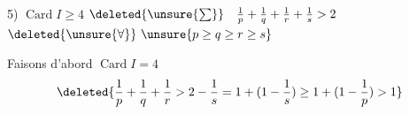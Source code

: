 5) $\operatorname{Card}I\ge4$\qquad
$\deleted{\unsure{\sum}}\quad\frac1p+\frac1q+\frac1r+\frac1s>2$\qquad
$\deleted{\unsure{\forall}}\ \unsure{p\ge q\ge r\ge s}$

Faisons d'abord $\operatorname{Card}I=4$
\[
\deleted{\frac1p+\frac1q+\frac1r>2-\frac1s=1+(1-\frac1s)\ge1+(1-\frac1p)>1}
\]
